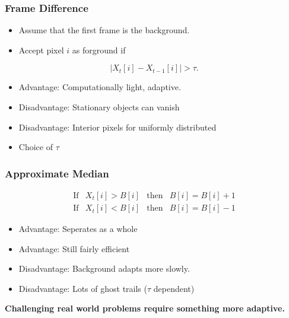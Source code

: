 \documentclass{beamer}
\begin{document}
\begin{frame}
  \frametitle{Frame Difference}

  \begin{itemize}
  \item Assume that the first frame is the background.
  \item Accept pixel $i$ as forground if
  \end{itemize}

  \begin{equation*}
    \label{eq:1}
    |X_t[i] - X_{t-1}[i]| > \tau.
  \end{equation*}
 \pause 
  \begin{itemize}
	  \item Advantage: Computationally light, adaptive.
	  \item Disadvantage: Stationary objects can vanish
          \item Disadvantage: Interior pixels for uniformly distributed
          \item Choice of $\tau$
	\end{itemize}
 \end{frame}

\begin{frame}
  \frametitle{Approximate Median}

\[  \begin{array}{cccc}
\text{If} & X_t[i] > B[i] & \text{then} & B[i] = B[i] + 1 \\
\text{If} & X_t[i] < B[i] & \text{then} & B[i] = B[i] - 1 \end{array} \] 
\pause
  \begin{itemize}
	  \item Advantage: Seperates as a whole
          \item Advantage: Still fairly efficient 
	  \item Disadvantage: Background adapts more slowly.  
	  \item Disadvantage: Lots of ghost trails ($\tau$ dependent)
  	\end{itemize}

 \bf{Challenging real world problems require something more adaptive.}

\end{frame}
\end{document}
